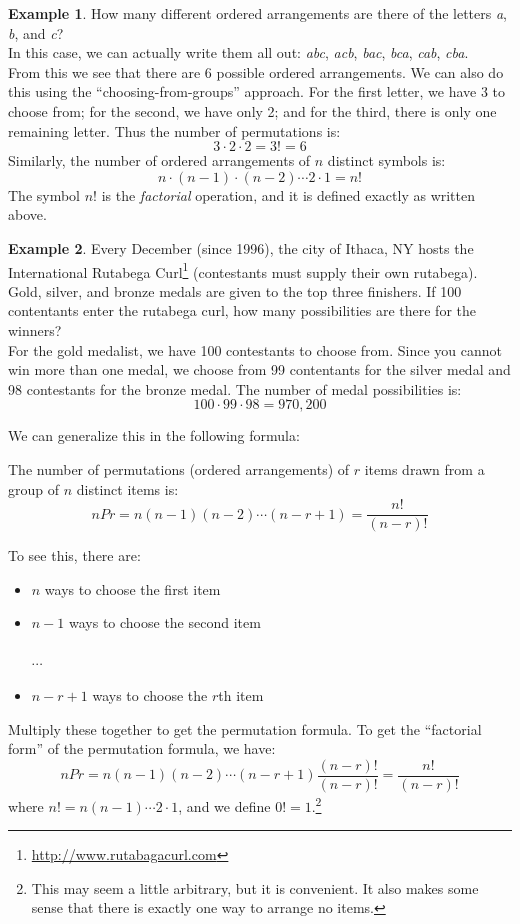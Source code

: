 \documentclass[12pt]{article}
\theoremstyle{definition}
\newtheorem*{example}{Example}
\theoremstyle{remark}
\begin{document}
\begin{example}How many different ordered arrangements are there of the letters \emph{a}, \emph{b}, and \emph{c}? \\

In this case, we can actually write them all out: \emph{abc}, \emph{acb}, \emph{bac}, \emph{bca}, \emph{cab}, \emph{cba}.\\
From this we see that there are 6 possible ordered arrangements. We can also do this using the ``choosing-from-groups'' approach. For the first letter, we have 3 to choose from; for the second, we have only 2; and for the third, there is only one remaining letter. Thus the number of permutations is:
\[
3 \cdot 2 \cdot 2 = 3! = 6
\]
Similarly, the number of ordered arrangements of $n$ distinct symbols is:
\[
n \cdot (n-1) \cdot (n-2) \cdots 2 \cdot 1 = n!
\]
The symbol $n!$ is the \emph{factorial} operation, and it is defined exactly as written above.
\end{example}

\begin{example}Every December (since 1996), the city of Ithaca, NY hosts the International Rutabega Curl\footnote{\url{http://www.rutabagacurl.com}} (contestants must supply their own rutabega). Gold, silver, and bronze medals are given to the top three finishers. If 100 contentants enter the rutabega curl, how many possibilities are there for the winners?\\

For the gold medalist, we have 100 contestants to choose from. Since you cannot win more than one medal, we choose from 99 contentants for the silver medal and 98 contestants for the bronze medal. The number of medal possibilities is:
\[
100 \cdot 99 \cdot 98 = 970,200
\]
\end{example}

We can generalize this in the following formula:

\begin{framed}
The number of permutations (ordered arrangements) of $r$ items drawn from a group of $n$ distinct items is:
\[
nPr = n (n-1)(n-2)\cdots(n - r + 1) = \frac{n!}{(n-r)!}
\]
\end{framed}
To see this, there are:
\begin{itemize}
\item $n$ ways to choose the first item
\item $n-1$ ways to choose the second item\\ \\$\cdots$
\item $n - r + 1$ ways to choose the $r$th item
\end{itemize}
Multiply these together to get the permutation formula. To get the ``factorial form'' of the permutation formula, we have:
\[
nPr = n (n-1)(n-2)\cdots(n - r + 1)\frac{(n-r)!}{(n-r)!} = \frac{n!}{(n-r)!}
\]
where $n! = n(n-1)\cdots2\cdot1$, and we define $0! = 1.$\footnote{This may seem a little arbitrary, but it is convenient. It also makes some sense that there is exactly one way to arrange no items.}
\end{document}
